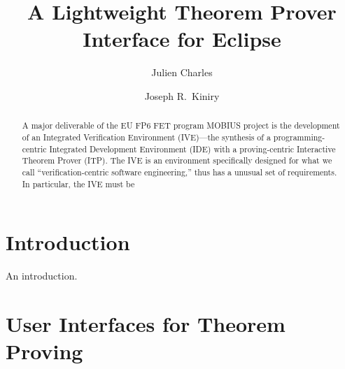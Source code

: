 \documentclass{llncs}
\begin{document}
\mainmatter
\title{A Lightweight Theorem Prover Interface for Eclipse}

\author{Julien Charles \and Joseph R.~Kiniry}

\maketitle


\begin{abstract}

  A major deliverable of the EU FP6 FET program MOBIUS project is the
  development of an Integrated Verification Environment (IVE)---the
  synthesis of a programming-centric Integrated Development
  Environment (IDE) with a proving-centric Interactive Theorem Prover
  (ITP).  The IVE is an environment specifically designed for what we
  call ``verification-centric software engineering,'' thus has a
  unusual set of requirements.  In particular, the IVE must be 

\end{abstract}



\section{Introduction}
\label{sec:introduction}

An introduction.

\section{User Interfaces for Theorem Proving}
\label{sec:user-interf-theor}
\end{document}
